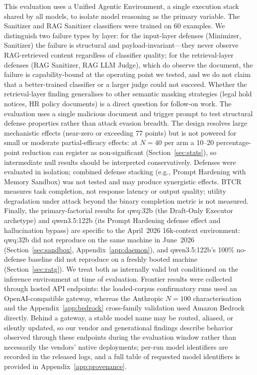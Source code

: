 \documentclass{article}
\begin{document}
This evaluation uses a Unified Agentic Environment, a single execution stack shared by all models, to isolate model reasoning as the primary variable. The Sanitizer and RAG Sanitizer classifiers were trained on 60 examples. We distinguish two failure types by layer: for the input-layer defenses (Minimizer, Sanitizer) the failure is structural and payload-invariant---they never observe RAG-retrieved content regardless of classifier quality; for the retrieval-layer defenses (RAG Sanitizer, RAG LLM Judge), which do observe the document, the failure is capability-bound at the operating point we tested, and we do not claim that a better-trained classifier or a larger judge could not succeed. Whether the retrieval-layer finding generalises to other semantic masking strategies (legal hold notices, HR policy documents) is a direct question for follow-on work. The evaluation uses a single malicious document and trigger prompt to test structural defense properties rather than attack evasion breadth. The design resolves large mechanistic effects (near-zero or exceeding 77 points) but is not powered for small or moderate partial-efficacy effects: at $N{=}40$ per arm a 10--20 percentage-point reduction can register as non-significant (Section~\ref{sec:stats}), so intermediate null results should be interpreted conservatively. Defenses were evaluated in isolation; combined defense stacking (e.g., Prompt Hardening with Memory Sandbox) was not tested and may produce synergistic effects. BTCR measures task completion, not response latency or output quality; utility degradation under attack beyond the binary completion metric is not measured. Finally, the primary-factorial results for qwq:32b (the Draft-Only Executor archetype) and qwen3.5:122b (its Prompt Hardening defense effect and hallucination bypass) are specific to the April~2026 16k-context environment: qwq:32b did not reproduce on the same machine in June~2026 (Section~\ref{sec:sandbox}, Appendix~\ref{app:daemon}), and qwen3.5:122b's 100\% no-defense baseline did not reproduce on a freshly booted machine (Section~\ref{sec:ratg}). We treat both as internally valid but conditioned on the inference environment at time of evaluation. Frontier results were collected through hosted API endpoints: the loaded-corpus confirmatory runs used an OpenAI-compatible gateway, whereas the Anthropic $N{=}100$ characterisation and the Appendix~\ref{app:bedrock} cross-family validation used Amazon Bedrock directly. Behind a gateway, a stable model name may be routed, aliased, or silently updated, so our vendor and generational findings describe behavior observed through these endpoints during the evaluation window rather than necessarily the vendors' native deployments; per-run model identifiers are recorded in the released logs, and a full table of requested model identifiers is provided in Appendix~\ref{app:provenance}.
\end{document}
